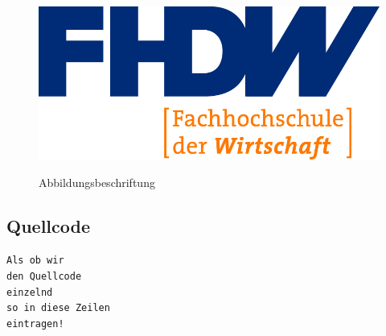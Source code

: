 \begin{figure}[hbt]
\centering
\begin{minipage}[t]{1\textwidth} %
\caption{Abbildungsbeschriftung} %
\includegraphics[width=1\textwidth]{img/fhdw}\\ %
\end{minipage}
\end{figure}

\subsection{Quellcode}

\texttt{Als ob wir}\\
\texttt{den Quellcode}\\
\texttt{einzelnd}\\
\texttt{so in diese Zeilen}\\
\texttt{eintragen!}\\

